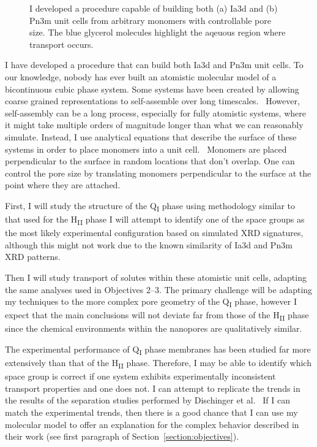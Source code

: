 \documentclass{article}
\begin{document}
\begin{figure}
\begin{subfigure}{0.49\linewidth}
  \caption{}\label{fig:pn3m}
  \end{subfigure}
  \caption{I developed a procedure capable of building both (a) Ia3d and (b) Pn3m
  unit cells from arbitrary monomers with controllable pore size. The blue
  glycerol molecules highlight the aqeuous region where transport occurs.}\label{fig:q1_unitcells}
  \vspace{-0.5cm}
  \end{figure}
  
  I have developed a procedure that can build both Ia3d and Pn3m unit cells.
  To our knowledge, nobody has ever built an atomistic molecular model of 
  a bicontinuous cubic phase system. Some systems have been created by 
  allowing coarse grained representations to self-assemble over long 
  timescales.~\cite{mondal_self-assembly_2013} However, self-assembly
  can be a long process, especially for fully atomistic systems, where it
  might take multiple orders of magnitude longer than what we can 
  reasonably simulate. Instead, I use analytical equations that describe
  the surface of these systems in order to place monomers into a unit cell.~\cite{benedicto_bicontinuous_1997}
  Monomers are placed perpendicular to the surface in random locations 
  that don't overlap. One can control the pore size by translating monomers
  perpendicular to the surface at the point where they are attached.
  
  First, I will study the structure of the Q\textsubscript{I} phase using
  methodology similar to that used for the H\textsubscript{II} phase 
  I will attempt to identify one of the space groups as the most likely
  experimental configuration based on simulated XRD signatures, although
  this might not work due to the known similarity of Ia3d and Pn3m XRD 
  patterns.
  
  Then I will study transport of solutes within these atomistic unit cells, 
  adapting the same analyses used in Objectives 2--3. The primary 
  challenge will be adapting my techniques to the more complex pore geometry
  of the Q\textsubscript{I} phase, however I expect that the main conclusions
  will not deviate far from those of the H\textsubscript{II} phase since
  the chemical environments within the nanopores are qualitatively similar. 
  
  The experimental performance of Q\textsubscript{I} phase membranes has been
  studied far more extensively than that of the H\textsubscript{II} phase. 
  Therefore, I may be able to identify which space group is correct if
  one system exhibits experimentally inconsistent transport properties and one
  does not. I can attempt to replicate the trends in the results of the separation
  studies performed by Dischinger et al.~\cite{dischinger_application_2017} If
  I can match the experimental trends, then there is a good chance that I can
  use my molecular model to offer an explanation for the complex behavior described
  in their work (see first paragraph of Section~\ref{section:objectives}).
\end{document}
